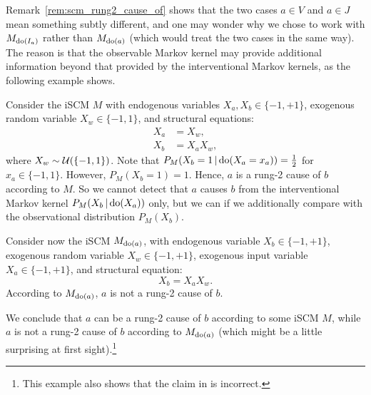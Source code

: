 Remark~\ref{rem:scm_rung2_cause_of} shows that the two cases $a \in V$ and $a \in J$ mean something subtly different, and one may wonder why we chose to work with $M_{\operatorname{do}(I_a)}$ rather than $M_{\operatorname{do}(a)}$ (which would treat the two cases in the same way). 
The reason is that the observable Markov kernel may provide additional information beyond that provided by the interventional Markov kernels, as the following example shows.
\begin{Eg}\label{eg:scm_cause_of_include_observational}
  Consider the iSCM $M$ with endogenous variables $X_a, X_b \in \{-1,+1\}$, exogenous random variable $X_w \in \{-1,1\}$, and structural equations:
  \begin{align*}
    X_a &= X_w, \\
    X_b &= X_a X_w,
  \end{align*}
  where $X_w \sim \mathcal{U}(\{-1,1\})$.
  Note that $P_M(X_b = 1 \operatorname*{|} \operatorname{do}(X_a = x_a)) = \tfrac{1}{2}$ for $x_a \in \{-1,1\}$.
  However, $P_M(X_b = 1) = 1$.
  Hence, $a$ is a rung-2 cause of $b$ according to $M$.
  So we cannot detect that $a$ causes $b$ from the interventional Markov kernel $P_M(X_b \operatorname*{|} \operatorname{do}(X_a))$ only, but we can if we additionally compare with the observational distribution $P_M(X_b)$.

  Consider now the iSCM $M_{\operatorname{do}(a)}$, with endogenous variable $X_b \in \{-1,+1\}$, exogenous random variable $X_w \in \{-1,+1\}$, exogenous input variable $X_a \in \{-1,+1\}$, and structural equation:
  $$X_b = X_a X_w.$$
  According to $M_{\operatorname{do}(a)}$, $a$ is not a rung-2 cause of $b$.

  We conclude that $a$ can be a rung-2 cause of $b$ according to some iSCM $M$, while $a$ is not a rung-2 cause of $b$ according to $M_{\operatorname{do}(a)}$ (which might be a little surprising at first sight).\footnote{This example also shows that the claim in \cite[Proposition 6.13]{PJS17} is incorrect.}
\end{Eg}
